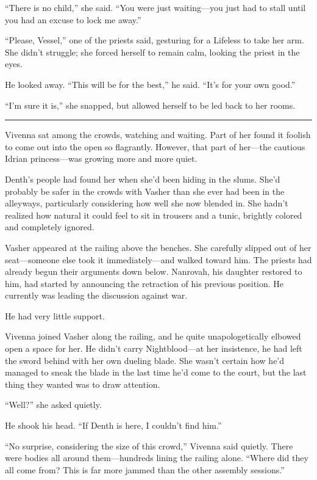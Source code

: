 “There is no child,” she said. “You were just waiting—you just had to stall until you had an excuse to lock me away.”

“Please, Vessel,” one of the priests said, gesturing for a Lifeless to take her arm. She didn’t struggle; she forced herself to remain calm, looking the priest in the eyes.

He looked away. “This will be for the best,” he said. “It’s for your own good.”

“I’m sure it is,” she snapped, but allowed herself to be led back to her rooms.

\bigskip \hrule \bigskip

Vivenna sat among the crowds, watching and waiting. Part of her found it foolish to come out into the open so flagrantly. However, that part of her—the cautious Idrian princess—was growing more and more quiet.

Denth’s people had found her when she’d been hiding in the slums. She’d probably be safer in the crowds with Vasher than she ever had been in the alleyways, particularly considering how well she now blended in. She hadn’t realized how natural it could feel to sit in trousers and a tunic, brightly colored and completely ignored.

Vasher appeared at the railing above the benches. She carefully slipped out of her seat—someone else took it immediately—and walked toward him. The priests had already begun their arguments down below. Nanrovah, his daughter restored to him, had started by announcing the retraction of his previous position. He currently was leading the discussion against war.

He had very little support.

Vivenna joined Vasher along the railing, and he quite unapologetically elbowed open a space for her. He didn’t carry Nightblood—at her insistence, he had left the sword behind with her own dueling blade. She wasn’t certain how he’d managed to sneak the blade in the last time he’d come to the court, but the last thing they wanted was to draw attention.

“Well?” she asked quietly.

He shook his head. “If Denth is here, I couldn’t find him.”

“No surprise, considering the size of this crowd,” Vivenna said quietly. There were bodies all around them—hundreds lining the railing alone. “Where did they all come from? This is far more jammed than the other assembly sessions.”

